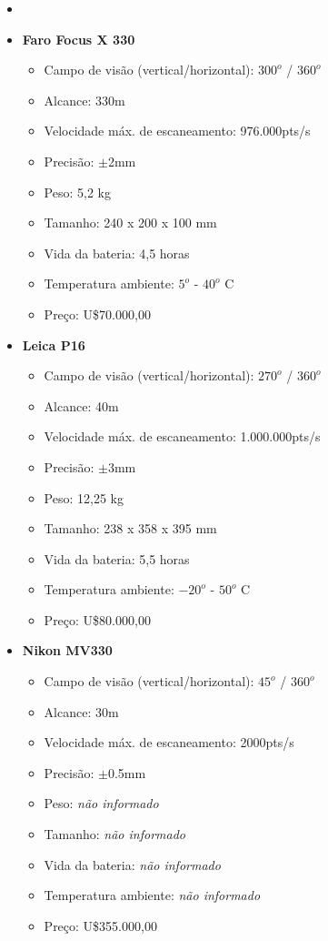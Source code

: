 \begin{itemize}
  \item \item \textbf{Faro Focus X 330}
  	\begin{itemize}
  		\item Campo de visão (vertical/horizontal): $300^o$ / $360^o$
  		\item Alcance: 330m
  		\item Velocidade máx. de escaneamento: 976.000pts/s
  		\item Precisão: $\pm$2mm
  		\item Peso: 5,2 kg
  		\item Tamanho: 240 x 200 x 100 mm
  		\item Vida da bateria: 4,5 horas
  		\item Temperatura ambiente: $5^o$ - $40^o$ C
  		\item Preço: U\$70.000,00
	\end{itemize}
  \item \textbf{Leica P16}
  	\begin{itemize}
  		\item Campo de visão (vertical/horizontal): $270^o$ / $360^o$
  		\item Alcance: 40m
  		\item Velocidade máx. de escaneamento: 1.000.000pts/s
  		\item Precisão: $\pm$3mm
  		\item Peso: 12,25 kg
  		\item Tamanho: 238 x 358 x 395 mm
  		\item Vida da bateria: 5,5 horas
  		\item Temperatura ambiente: $-20^o$ - $50^o$ C
  		\item Preço: U\$80.000,00
	\end{itemize}
   \item \textbf{Nikon MV330}
  	\begin{itemize}
  		\item Campo de visão (vertical/horizontal): $45^o$ / $360^o$
  		\item Alcance: 30m
  		\item Velocidade máx. de escaneamento: 2000pts/s
  		\item Precisão: $\pm$0.5mm
  		\item Peso: \textit{não informado}
  		\item Tamanho: \textit{não informado}
  		\item Vida da bateria: \textit{não informado}
  		\item Temperatura ambiente: \textit{não informado}
  		\item Preço: U\$355.000,00
	\end{itemize}


\end{itemize}


